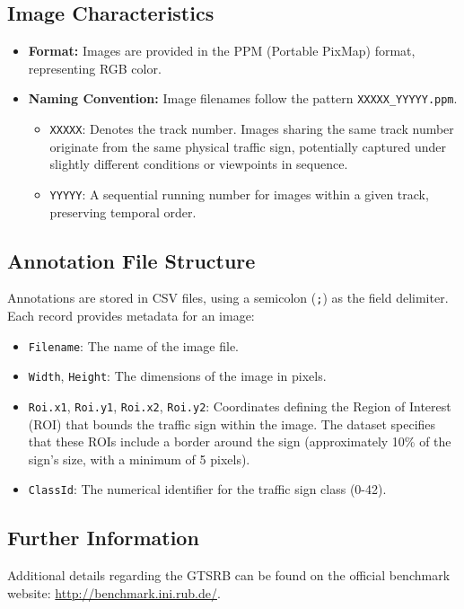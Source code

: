 \documentclass[11pt, a4paper]{article}
\begin{document}
\subsection{Image Characteristics}
\begin{itemize}
    \item \textbf{Format:} Images are provided in the PPM (Portable PixMap) format, representing RGB color.
    \item \textbf{Naming Convention:} Image filenames follow the pattern \texttt{XXXXX\_YYYYY.ppm}.
        \begin{itemize}
            \item \texttt{XXXXX}: Denotes the track number. Images sharing the same track number originate from the same physical traffic sign, potentially captured under slightly different conditions or viewpoints in sequence.
            \item \texttt{YYYYY}: A sequential running number for images within a given track, preserving temporal order.
        \end{itemize}
\end{itemize}

\subsection{Annotation File Structure}
Annotations are stored in CSV files, using a semicolon (\texttt{;}) as the field delimiter. Each record provides metadata for an image:
\begin{itemize}
    \item \texttt{Filename}: The name of the image file.
    \item \texttt{Width}, \texttt{Height}: The dimensions of the image in pixels.
    \item \texttt{Roi.x1}, \texttt{Roi.y1}, \texttt{Roi.x2}, \texttt{Roi.y2}: Coordinates defining the Region of Interest (ROI) that bounds the traffic sign within the image. The dataset specifies that these ROIs include a border around the sign (approximately 10\% of the sign's size, with a minimum of 5 pixels).
    \item \texttt{ClassId}: The numerical identifier for the traffic sign class (0-42).
\end{itemize}

\subsection{Further Information}
Additional details regarding the GTSRB can be found on the official benchmark website: \url{http://benchmark.ini.rub.de/}.
\end{document}
